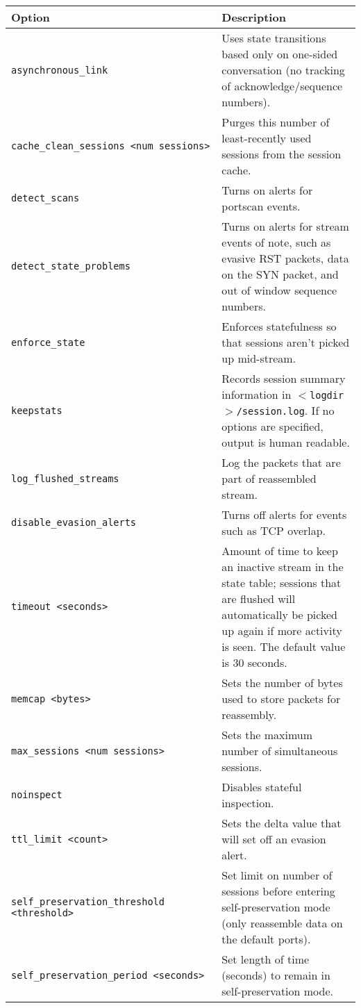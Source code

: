 \documentclass[english]{report}
\begin{document}
\begin{tabular}{| l | p{3.5in} |}
\hline
\textbf{Option} & \textbf{Description}\\
\hline 
\hline 
\texttt{asynchronous\_link} & Uses state transitions based only on one-sided conversation (no tracking of acknowledge/sequence numbers).\\
\hline
\texttt{cache\_clean\_sessions~<num~sessions>} & Purges this number of least-recently used sessions from the session cache.\\
\hline
\texttt{detect\_scans} & Turns on alerts for portscan events.\\
\hline
\texttt{detect\_state\_problems} & Turns on alerts for stream events of note, such as evasive RST packets, data on the SYN packet, and out of window sequence numbers.\\
\hline
\texttt{enforce\_state} & Enforces statefulness so that sessions aren't picked up mid-stream.\\
\hline
\texttt{keepstats} & Records session summary information in \texttt{$<$logdir$>$/session.log}. If no options are specified, output is human readable.\\
\hline
\texttt{log\_flushed\_streams} & Log the packets that are part of reassembled stream.\\
\hline
\texttt{disable\_evasion\_alerts} & Turns off alerts for events such as TCP
overlap.\\
\hline
\texttt{timeout <seconds>} & Amount of time to keep an inactive stream in the state table; sessions that are flushed will automatically be picked up again if more activity is seen. The default value is 30 seconds.\\
\hline
\texttt{memcap <bytes>} & Sets the number of bytes used to store packets for reassembly.\\
\hline
\texttt{max\_sessions <num sessions>} & Sets the maximum number of simultaneous sessions.\\
\hline
\texttt{noinspect} & Disables stateful inspection.\\
\hline
\texttt{ttl\_limit <count>} & Sets the delta value that will set off an evasion alert.\\
\hline
\texttt{self\_preservation\_threshold <threshold>} & Set limit on number of sessions before entering self-preservation mode (only reassemble data on the default ports).\\
\hline
\texttt{self\_preservation\_period <seconds>} & Set length of time (seconds) to remain in self-preservation mode.\\

\end{tabular}
\end{document}
